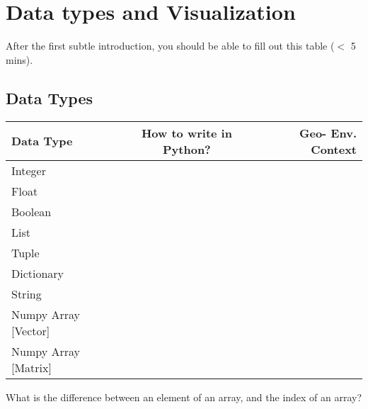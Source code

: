 
\section{Data types and Visualization}
After the first subtle introduction, you should be able to fill out this table ($<$ 5 mins).
\subsection{Data Types}

    \begin{center}
      \label{tab:table1}
      \begin{tabular}{l|c|r} %
        \textbf{Data Type} & \textbf{How to write in Python?} & \textbf{Geo- Env. Context}\\
        \hline
        Integer &  & \\
        Float &  & \\
        Boolean &  & \\
        List &  & \\
        Tuple &  & \\
        Dictionary &  & \\
        String &  & \\
        Numpy Array [Vector] &  & \\
        Numpy Array [Matrix] &  & \\
      \end{tabular}
    \end{center}
    What is the difference between an element of an array, and the index of an array?

